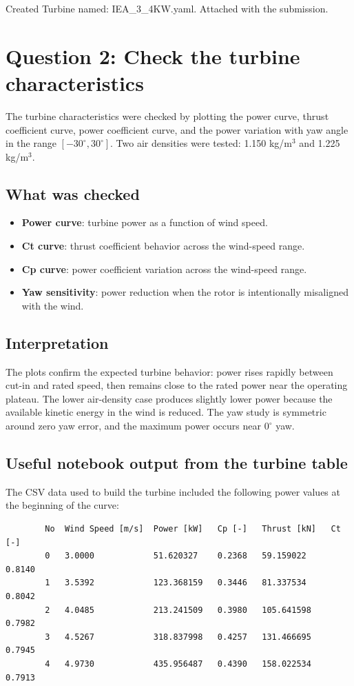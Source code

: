 \documentclass[11pt,a4paper]{article}
\begin{document}
	Created Turbine named: IEA\_3\_4KW.yaml.
	Attached with the submission.
	
	\section{Question 2: Check the turbine characteristics}
	The turbine characteristics were checked by plotting the power curve, thrust coefficient curve, power coefficient curve, and the power variation with yaw angle in the range $[-30^\circ, 30^\circ]$. Two air densities were tested: 1.150 kg/m$^3$ and 1.225 kg/m$^3$.
	
	\subsection{What was checked}
	\begin{itemize}[leftmargin=1.2em]
		\item \textbf{Power curve}: turbine power as a function of wind speed.
		\item \textbf{Ct curve}: thrust coefficient behavior across the wind-speed range.
		\item \textbf{Cp curve}: power coefficient variation across the wind-speed range.
		\item \textbf{Yaw sensitivity}: power reduction when the rotor is intentionally misaligned with the wind.
	\end{itemize}
	
	\subsection{Interpretation}
	The plots confirm the expected turbine behavior: power rises rapidly between cut-in and rated speed, then remains close to the rated power near the operating plateau. The lower air-density case produces slightly lower power because the available kinetic energy in the wind is reduced. The yaw study is symmetric around zero yaw error, and the maximum power occurs near $0^\circ$ yaw.
	
	\subsection{Useful notebook output from the turbine table}
	The CSV data used to build the turbine included the following power values at the beginning of the curve:
	\begin{lstlisting}
		No  Wind Speed [m/s]  Power [kW]   Cp [-]   Thrust [kN]   Ct [-]
		0   3.0000            51.620327    0.2368   59.159022     0.8140
		1   3.5392            123.368159   0.3446   81.337534     0.8042
		2   4.0485            213.241509   0.3980   105.641598    0.7982
		3   4.5267            318.837998   0.4257   131.466695    0.7945
		4   4.9730            435.956487   0.4390   158.022534    0.7913
	\end{lstlisting}
	
\end{document}
